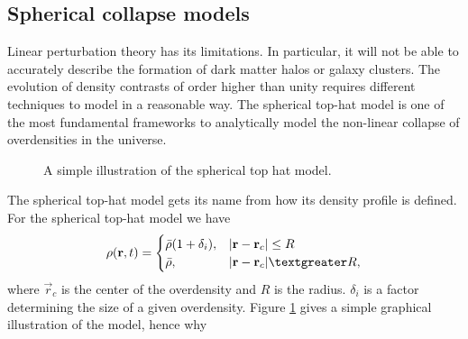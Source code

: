\subsection{Spherical collapse models}
Linear perturbation theory has its limitations. In particular, it will not be
able to accurately describe the formation of dark matter halos or galaxy
clusters. The evolution of density contrasts of order higher than unity requires
different techniques to model in a reasonable way. The spherical top-hat model
is one of the most fundamental frameworks to analytically model the non-linear
collapse of overdensities in the universe.
\begin{figure}
    \caption{A simple illustration of the spherical top hat model.}
    \label{fig:tophat}
\end{figure}
The spherical top-hat model gets its name from how its density profile is
defined. For the spherical top-hat model we have
\begin{equation}
    \rho(\vec{r},t) =
    \begin{cases} 
        \bar{\rho}(1+\delta_i), & \vert\vec{r}-\vec{r}_c\vert\leq R \\
        \bar{\rho}, & \vert\vec{r}-\vec{r}_c\vert \textgreater R,
     \end{cases} 
\end{equation}
where $\vec{r}_c$ is the center of the overdensity and $R$ is the radius.
$\delta_i$ is a factor determining the size of a given overdensity. Figure
\ref{fig:tophat} gives a simple graphical illustration of the model, hence why
